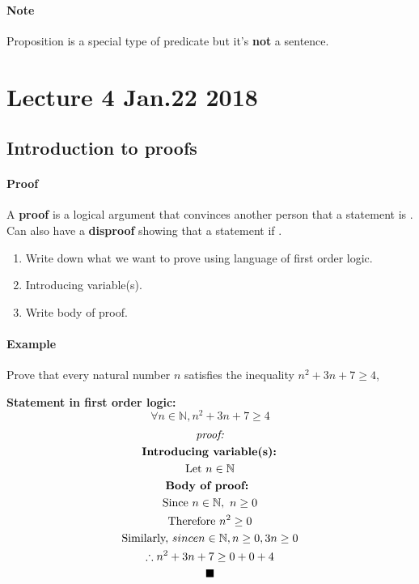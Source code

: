 \documentclass{article}
\begin{document}
	\paragraph{Note} Proposition is a special type of predicate but it's \textbf{not} a sentence.
	
	\section{Lecture 4 Jan.22 2018}
	\subsection{Introduction to proofs}
	\paragraph{Proof} A \textbf{proof} is a logical argument that convinces another person that a statement is . Can also have a \textbf{disproof} showing that a statement if .
	\begin{enumerate}
		\item Write down what we want to prove using language of first order logic.
		\item Introducing variable(s).
		\item Write body of proof.
	\end{enumerate}
	\paragraph{Example} Prove that every natural number $n$ satisfies the inequality $n^2 + 3n + 7 \geq 4$,
	
	\textbf{Statement in first order logic:}
	\[
		\forall n \in \mathbb{N}, n^2 + 3n + 7 \geq 4
	\]
	\begin{multline*}
		\emph{proof:} \\
		\textbf{ Introducing variable(s): } \\
		\text{Let } n \in \mathbb{N} \\
		\textbf{Body of proof: } \\
		\text{Since } n \in \mathbb{N},\ n \geq 0 \\
		\text{Therefore } n^2 \geq 0 \\
		\text{Similarly, } since n \in \mathbb{N}, n \geq 0, 3n \geq 0 \\
		\therefore n^2 + 3n + 7 \geq 0 + 0 + 4 \\
		\blacksquare
	\end{multline*}
	
\end{document}
